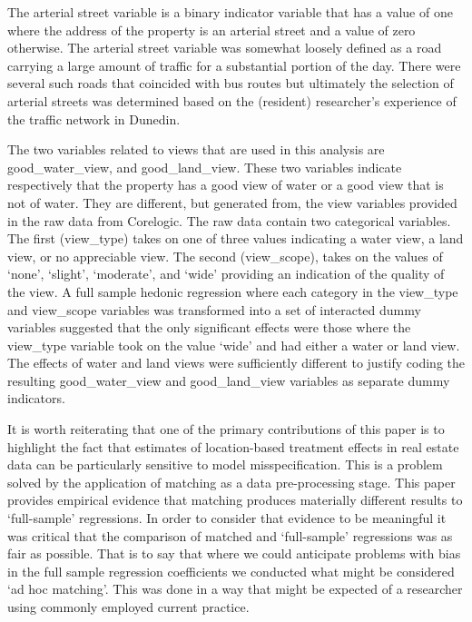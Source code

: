 \documentclass[]{article}
\begin{document}
The arterial street variable is a binary indicator variable that has a
value of one where the address of the property is an arterial street and
a value of zero otherwise. The arterial street variable was somewhat
loosely defined as a road carrying a large amount of traffic for a
substantial portion of the day. There were several such roads that
coincided with bus routes but ultimately the selection of arterial
streets was determined based on the (resident) researcher's experience
of the traffic network in Dunedin.

The two variables related to views that are used in this analysis are
good\_water\_view, and good\_land\_view. These two variables indicate
respectively that the property has a good view of water or a good view
that is not of water. They are different, but generated from, the view
variables provided in the raw data from Corelogic. The raw data contain
two categorical variables. The first (view\_type) takes on one of three
values indicating a water view, a land view, or no appreciable view. The
second (view\_scope), takes on the values of `none', `slight',
`moderate', and `wide' providing an indication of the quality of the
view. A full sample hedonic regression where each category in the
view\_type and view\_scope variables was transformed into a set of
interacted dummy variables suggested that the only significant effects
were those where the view\_type variable took on the value `wide' and
had either a water or land view. The effects of water and land views
were sufficiently different to justify coding the resulting
good\_water\_view and good\_land\_view variables as separate dummy
indicators.

It is worth reiterating that one of the primary contributions of this
paper is to highlight the fact that estimates of location-based
treatment effects in real estate data can be particularly sensitive to
model misspecification. This is a problem solved by the application of
matching as a data pre-processing stage. This paper provides empirical
evidence that matching produces materially different results to
`full-sample' regressions. In order to consider that evidence to be
meaningful it was critical that the comparison of matched and
`full-sample' regressions was as fair as possible. That is to say that
where we could anticipate problems with bias in the full sample
regression coefficients we conducted what might be considered `ad hoc
matching'. This was done in a way that might be expected of a researcher
using commonly employed current practice.
\end{document}
